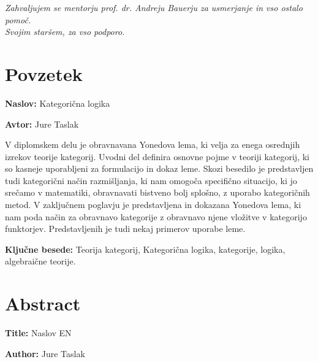\documentclass[12pt,a4paper]{book}
\newcommand{\ttitle}{Kategorična logika}
\newcommand{\ttitleEn}{Naslov EN}
\newcommand{\tauthor}{Jure Taslak}
\newcommand{\tkeywords}{Teorija kategorij, Kategorična logika, kategorije, logika, algebraične teorije}
\newcommand{\clearemptydoublepage}{\newpage{\pagestyle{empty}\cleardoublepage}}
\theoremstyle{definition}
\theoremstyle{plain}
\theoremstyle{definition}
\theoremstyle{remark}
\begin{document}
\vspace{2cm}

\clearemptydoublepage

\thispagestyle{empty}\mbox{}\vfill\null\it%
\noindent
Zahvaljujem se mentorju prof. dr. Andreju Bauerju za usmerjanje in vso ostalo pomoč. \\
Svojim staršem, za vso podporo. \\
\rm\normalfont

\clearemptydoublepage

\pagestyle{empty}
\def\thepage{}%
\tableofcontents{}

\clearemptydoublepage


\chapter*{Povzetek}

\noindent\textbf{Naslov:} \ttitle
\bigskip

\noindent\textbf{Avtor:} \tauthor
\bigskip

\noindent
V diplomskem delu je obravnavana Yonedova lema, ki velja za enega osrednjih izrekov teorije kategorij. Uvodni del definira osnovne pojme v teoriji kategorij, ki so kasneje uporabljeni za formulacijo in dokaz leme. Skozi besedilo je predstavljen tudi kategorični način razmišljanja, ki nam omogoča specifično situacijo, ki jo srečamo v matematiki, obravnavati bistveno bolj splošno, z uporabo kategoričnih metod.
V zaključnem poglavju je predstavljena in dokazana Yonedova lema, ki nam poda način za obravnavo kategorije z obravnavo njene vložitve v kategorijo funktorjev. Predstavljenih je tudi nekaj primerov uporabe leme.
\bigskip

\noindent\textbf{Ključne besede:} \tkeywords.
\clearemptydoublepage

\chapter*{Abstract}

\noindent\textbf{Title:} \ttitleEn
\bigskip

\noindent\textbf{Author:} \tauthor
\bigskip
\end{document}
